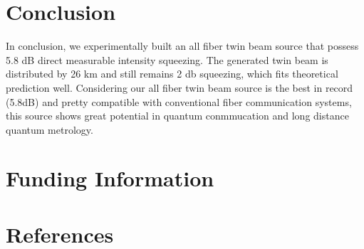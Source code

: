\documentclass[9pt,twocolumn,twoside]{osajnl}
\begin{document}
\section{Conclusion}
In conclusion, we experimentally built an all fiber twin beam source that possess 5.8 dB direct measurable intensity squeezing.
The generated twin beam is distributed by 26 km and still remains 2 db squeezing, which fits theoretical prediction well. Considering our all fiber twin beam source is the best in record (5.8dB) and pretty compatible with conventional fiber communication systems, this source shows great potential in quantum conmmucation and long distance quantum metrology.


\section{Funding Information}


\section{References}
\end{document}
